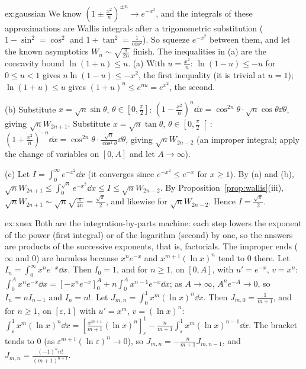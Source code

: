 \begin{solution}{ex:gaussian}
\idea We know $\left(1\pm\frac{x^2}n\right)^{\pm n}\to e^{-x^2}$, and the integrals of these approximations are Wallis integrals after a trigonometric substitution ($1-\sin^2=\cos^2$ and $1+\tan^2=\frac1{\cos^2}$). So squeeze $e^{-x^2}$ between them, and let the known asymptotics $W_n\sim\sqrt{\frac\pi{2n}}$ finish. The inequalities in (a) are the concavity bound $\ln(1+u)\le u$.
\writeup (a) With $u=\frac{x^2}n$: $\ln(1-u)\le-u$ for $0\le u<1$ gives $n\ln(1-u)\le-x^2$, the first inequality (it is trivial at $u=1$); $\ln(1+u)\le u$ gives $(1+u)^n\le e^{nu}=e^{x^2}$, the second.

(b) Substitute $x=\sqrt n\sin\theta$, $\theta\in\left[0,\frac\pi2\right]$: $\left(1-\frac{x^2}n\right)^n\dd x=\cos^{2n}\theta\cdot\sqrt n\cos\theta\dd\theta$, giving $\sqrt nW_{2n+1}$.
Substitute $x=\sqrt n\tan\theta$, $\theta\in\left[0,\frac\pi2\right[$: $\left(1+\frac{x^2}n\right)^{-n}\dd x=\cos^{2n}\theta\cdot\frac{\sqrt n}{\cos^2\theta}\dd\theta$, giving $\sqrt nW_{2n-2}$ (an improper integral; apply the change of variables on $[0,A]$ and let $A\to\infty$).

(c) Let $I=\int_0^\infty e^{-x^2}\dd x$ (it converges since $e^{-x^2}\le e^{-x}$ for $x\ge1$). By (a) and (b),
$\sqrt nW_{2n+1}\le\int_0^{\sqrt n}e^{-x^2}\dd x\le I\le\sqrt nW_{2n-2}$. By Proposition~\ref{prop:wallis}(iii),
$\sqrt nW_{2n+1}\sim\sqrt n\sqrt{\frac\pi{4n}}=\frac{\sqrt\pi}2$, and likewise for $\sqrt nW_{2n-2}$. Hence $I=\frac{\sqrt\pi}2$.
\end{solution}


\begin{solution}{ex:xnex}
\idea Both are the integration-by-parts machine: each step lowers the exponent of the power (first integral) or of the logarithm (second) by one, so the answers are products of the successive exponents, that is, factorials. The improper ends ($\infty$ and $0$) are harmless because $x^ne^{-x}$ and $x^{m+1}(\ln x)^n$ tend to $0$ there.
\writeup Let $I_n=\int_0^\infty x^ne^{-x}\dd x$. Then $I_0=1$, and for $n\ge1$, on $[0,A]$, with $u'=e^{-x}$, $v=x^n$: $\int_0^Ax^ne^{-x}\dd x=\left[-x^ne^{-x}\right]_0^A+n\int_0^Ax^{n-1}e^{-x}\dd x$; as $A\to\infty$, $A^ne^{-A}\to0$, so $I_n=nI_{n-1}$ and $I_n=n!$.
Let $J_{m,n}=\int_0^1x^m(\ln x)^n\dd x$. Then $J_{m,0}=\frac1{m+1}$, and for $n\ge1$, on $[\varepsilon,1]$ with $u'=x^m$, $v=(\ln x)^n$: $\int_\varepsilon^1x^m(\ln x)^n\dd x=\left[\frac{x^{m+1}}{m+1}(\ln x)^n\right]_\varepsilon^1-\frac n{m+1}\int_\varepsilon^1x^m(\ln x)^{n-1}\dd x$. The bracket tends to $0$ (as $\varepsilon^{m+1}(\ln\varepsilon)^n\to0$), so $J_{m,n}=-\frac n{m+1}J_{m,n-1}$, and $J_{m,n}=\frac{(-1)^nn!}{(m+1)^{n+1}}$.
\end{solution}


